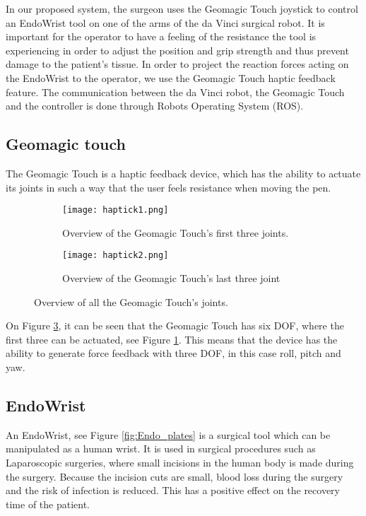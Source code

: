 In our proposed system, the surgeon uses the Geomagic Touch joystick to control an EndoWrist tool on one of the arms of the da Vinci surgical robot.
It is important for the operator to have a feeling of the resistance the tool is experiencing in order to adjust the position and grip strength and thus prevent damage to the patient's tissue.
In order to project the reaction forces acting on the EndoWrist to the operator, we use the Geomagic Touch haptic feedback feature. The communication between the da Vinci robot, the Geomagic Touch and the controller is done through Robots Operating System (ROS).



\subsection{Geomagic touch}\label{sec:Geomagic_touch}
The Geomagic Touch is a haptic feedback device, which has the ability to actuate its joints in such a way that the user feels resistance when moving the pen. 


\begin{figure}
  \centering
  \begin{subfigure}{.22\textwidth}
    \centering
    \texttt{[image: haptick1.png]}
    \caption{Overview of the Geomagic Touch's first three joints.}
    \label{fig:phantom1}
  \end{subfigure}
  \begin{subfigure}{.22\textwidth}
    \centering
    \texttt{[image: haptick2.png]}
    \caption{Overview of the Geomagic Touch's last three joint}
    \label{fig:phantom2}
  \end{subfigure}
\caption{Overview of all the Geomagic Touch's joints.}
\label{fig:phantom_omni}
\end{figure}


On Figure \ref{fig:phantom_omni}, it can be seen that the Geomagic Touch has six DOF, where the first three can be actuated, see Figure \ref{fig:phantom1}. This means that the device has the ability to generate force feedback with three DOF, in this case roll, pitch and yaw.



    
\subsection{EndoWrist}
An EndoWrist, see Figure \ref{fig:Endo_plates} is a surgical tool which can be manipulated as a human wrist.
It is used in surgical procedures such as Laparoscopic surgeries,  where small incisions in the human body is made during the surgery.
Because the incision cuts are small, blood loss during the surgery and the risk of infection is reduced. This has a positive effect on the recovery time of the patient\cite{RIGSP}.


